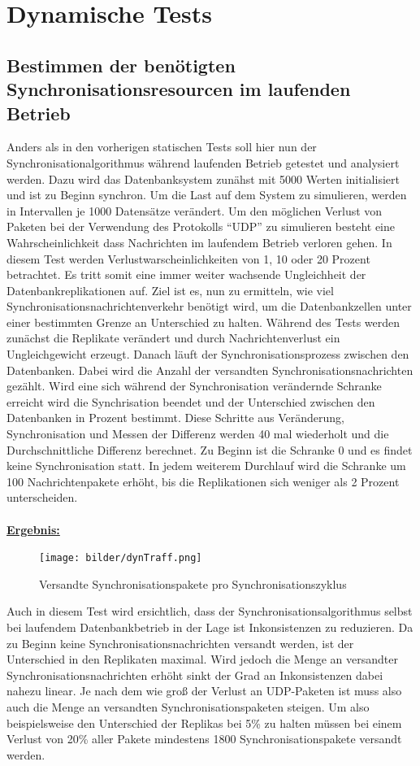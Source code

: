 \documentclass[a4paper,11pt,oneside,%
headsepline,												%
footsepline,												%
bibtotocnumbered									%
]{scrreprt}
\begin{document}
\section{Dynamische Tests}
\subsection{Bestimmen der benötigten Synchronisationsresourcen im laufenden Betrieb}
\label{ssec:DynTraffic}
Anders als in den vorherigen statischen Tests soll hier nun der Synchronisationalgorithmus während laufenden Betrieb getestet und analysiert werden. Dazu wird das Datenbanksystem zunähst mit 5000 Werten initialisiert und ist zu Beginn synchron. Um die Last auf dem System zu simulieren, werden in Intervallen je 1000 Datensätze verändert. Um den möglichen Verlust von Paketen bei der Verwendung des Protokolls \enquote{UDP} zu simulieren besteht eine Wahrscheinlichkeit dass Nachrichten im laufendem Betrieb verloren gehen. In diesem Test werden Verlustwarscheinlichkeiten von 1, 10 oder 20 Prozent betrachtet. Es tritt somit eine immer weiter wachsende Ungleichheit der Datenbankreplikationen auf. Ziel ist es, nun zu ermitteln, wie viel Synchronisationsnachrichtenverkehr benötigt wird, um die Datenbankzellen unter einer bestimmten Grenze an Unterschied zu halten. Während des Tests werden zunächst die Replikate verändert und durch Nachrichtenverlust ein Ungleichgewicht erzeugt. Danach läuft der Synchronisationsprozess zwischen den Datenbanken. Dabei wird die Anzahl der versandten Synchronisationsnachrichten gezählt. Wird eine sich während der Synchronisation verändernde Schranke erreicht wird die Synchrisation beendet und der Unterschied zwischen den Datenbanken in Prozent bestimmt. Diese Schritte aus Veränderung, Synchronisation und Messen der Differenz werden 40 mal wiederholt und die Durchschnittliche Differenz berechnet. Zu Beginn ist die Schranke 0 und es findet keine Synchronisation statt. In jedem weiterem Durchlauf wird die Schranke um 100 Nachrichtenpakete erhöht, bis die Replikationen sich weniger als 2 Prozent unterscheiden.\\\\

\underline{{\bf Ergebnis:}}
\begin{figure}[h!]
  \begin{center}
    \texttt{[image: bilder/dynTraff.png]}
  \end{center}
 \caption{Versandte Synchronisationspakete pro Synchronisationszyklus}
  \label{fig:EmptyDiffTraffic}
\end{figure}
Auch in diesem Test wird ersichtlich, dass der Synchronisationsalgorithmus selbst bei laufendem Datenbankbetrieb in der Lage ist Inkonsistenzen zu reduzieren. Da zu Beginn keine Synchronisationsnachrichten versandt werden, ist der Unterschied in den Replikaten maximal. Wird jedoch die Menge an versandter Synchronisationsnachrichten erhöht sinkt der Grad an Inkonsistenzen dabei nahezu linear. Je nach dem wie groß der Verlust an UDP-Paketen ist muss also auch die Menge an versandten Synchronisationspaketen steigen. Um also beispielsweise den Unterschied der Replikas bei 5\% zu halten müssen bei einem Verlust von 20\% aller Pakete mindestens 1800 Synchronisationspakete versandt werden.
\end{document}

